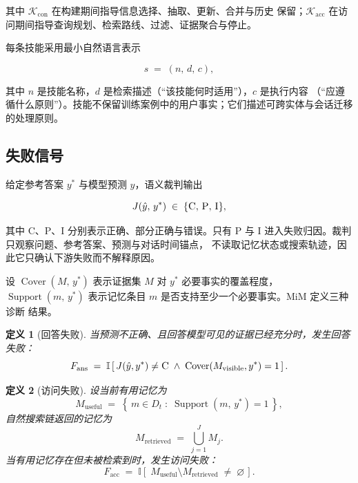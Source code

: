 \documentclass[UTF8,11pt]{ctexart}
\newtheorem{definition}{定义}[section]
\newcommand{\KK}{\mathcal{K}}
\newcommand{\II}{\mathbb{I}}
\DeclareMathOperator{\Cover}{Cover}
\DeclareMathOperator{\Support}{Support}
\begin{document}
\noindent 其中 $\KK_{\mathrm{con}}$ 在构建期间指导信息选择、抽取、更新、合并与历史
保留；$\KK_{\mathrm{acc}}$ 在访问期间指导查询规划、检索路线、过滤、证据聚合与停止。

每条技能采用最小自然语言表示

\begin{equation}
\label{eq:skill}
s \;=\; (n,\,d,\,c),
\end{equation}

\noindent 其中 $n$ 是技能名称，$d$ 是检索描述（“该技能何时适用”），$c$ 是执行内容
（“应遵循什么原则”）。技能不保留训练案例中的用户事实；它们描述可跨实体与会话迁移
的处理原则。

\subsection{失败信号}
\label{sec:prob-failure}

给定参考答案 $y^{*}$ 与模型预测 $\hat{y}$，语义裁判输出

\begin{equation}
\label{eq:judge}
J(\hat{y},\,y^{*}) \;\in\; \{\textsc{C},\,\textsc{P},\,\textsc{I}\},
\end{equation}

\noindent 其中 \textsc{C}、\textsc{P}、\textsc{I} 分别表示正确、部分正确与错误。只有
\textsc{P} 与 \textsc{I} 进入失败归因。裁判只观察问题、参考答案、预测与对话时间锚点，
不读取记忆状态或搜索轨迹，因此它只确认下游失败而不解释原因。

设 $\Cover(M,\,y^{*})$ 表示证据集 $M$ 对 $y^{*}$ 必要事实的覆盖程度，
$\Support(m,\,y^{*})$ 表示记忆条目 $m$ 是否支持至少一个必要事实。MiM 定义三种诊断
结果。

\begin{definition}[回答失败]
\label{def:ans}
当预测不正确、且回答模型可见的证据已经充分时，发生\emph{回答失败}：
\begin{equation}
\label{eq:fans}
F_{\mathrm{ans}} \;=\; \II\left[\,J(\hat{y},y^{*})\neq \textsc{C}
\;\land\; \Cover(M_{\mathrm{visible}}, y^{*}) = 1\,\right].
\end{equation}
\end{definition}

\begin{definition}[访问失败]
\label{def:acc}
设当前有用记忆为
\begin{equation}
\label{eq:museful}
M_{\mathrm{useful}} \;=\; \left\{\, m \in D_t \;:\; \Support(m,\,y^{*}) = 1 \,\right\},
\end{equation}
\noindent 自然搜索链返回的记忆为
\begin{equation}
\label{eq:mretrieved}
M_{\mathrm{retrieved}} \;=\; \bigcup_{j=1}^{J} M_j .
\end{equation}
\noindent 当有用记忆存在但未被检索到时，发生\emph{访问失败}：
\begin{equation}
\label{eq:facc}
F_{\mathrm{acc}} \;=\; \II\left[\; M_{\mathrm{useful}} \setminus M_{\mathrm{retrieved}}
\;\neq\; \varnothing \,\right].
\end{equation}
\end{definition}
\end{document}
